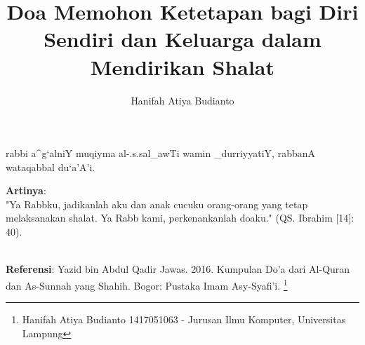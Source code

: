 \documentclass[a4paper,12pt]{article}
\title{\Large Doa Memohon Ketetapan bagi Diri Sendiri dan Keluarga dalam 
Mendirikan Shalat}
\author{\calligra Hanifah Atiya Budianto}
\begin{document}
\sffamily
\maketitle 
\fullvocalize
{}
\begin{arabtext}
\noindent
rabbi a^g`alniY muqiyma al-.s.sal_awTi wamin _durriyyatiY, rabbanA 
wataqabbal du`a'A'i.\\
\end{arabtext}
\noindent
\textbf{Artinya}:\\
\indent
"Ya Rabbku, jadikanlah aku dan anak cucuku orang-orang yang tetap 
melaksanakan shalat. Ya Rabb kami, perkenankanlah doaku." (QS. Ibrahim
[14]: 40).\\\\
\par
\noindent
\textbf{Referensi}: Yazid bin Abdul Qadir Jawas. 2016. Kumpulan Do'a dari
Al-Quran dan As-Sunnah yang Shahih. Bogor: Pustaka Imam Asy-Syafi'i.
\footnote{Hanifah Atiya Budianto 1417051063 - Jurusan Ilmu Komputer,
Universitas Lampung}
\end{document}
